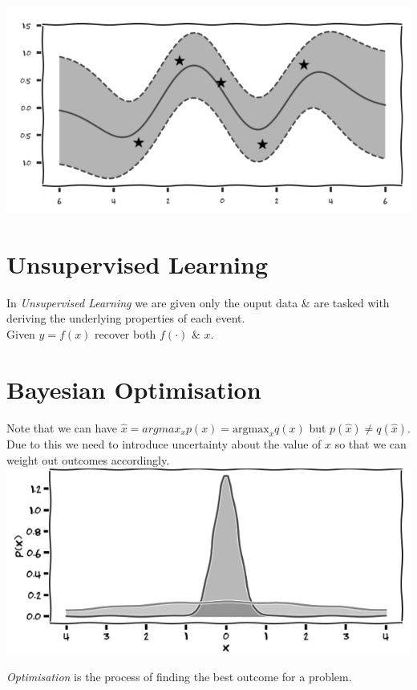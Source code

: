 \documentclass[11pt,a4paper]{article}
\begin{document}
\includegraphics[scale=.7]{img/noisyGaussianProcess.png}

\section{Unsupervised Learning}

In \textit{Unsupervised Learning} we are given only the ouput data \& are tasked with deriving the underlying properties of each event.\\
\ie Given $y=f(x)$ recover both $f(\cdot)$ \& $x$.

\section{Bayesian Optimisation}

Note that we can have $\hat{x}=argmax_xp(x)=\text{argmax}_xq(x)$ but $p(\hat{x})\neq q(\hat{x})$. Due to this we need to introduce uncertainty about the value of $x$ so that we can weight out outcomes accordingly.\\
\includegraphics[scale=.4]{img/uncertainty.png}

\textit{Optimisation} is the process of finding the best outcome for a problem.\\
\end{document}
